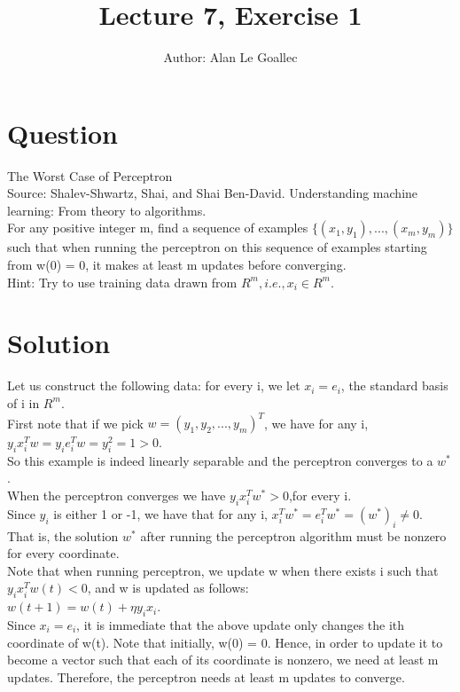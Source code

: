 \documentclass[11pt]{article}
\begin{document}
\title{Lecture 7, Exercise 1}
\maketitle
\author{Author: Alan Le Goallec}

\section{Question} The Worst Case of Perceptron\\
Source: Shalev-Shwartz, Shai, and Shai Ben-David. Understanding machine learning: From theory to algorithms.\\
For any positive integer m, find a sequence of examples $\{(x_1, y_1), ..., (x_m, y_m)\}$ such that when running the perceptron on this sequence of examples starting from w(0) = 0, it makes at least m updates before converging.\\

Hint: Try to use training data drawn from $R^m, i.e., x_i \in R^m$.


\section{Solution}
Let us construct the following data: for every i, we let $x_i = e_i$, the standard basis of i in $R^m$.\\
First note that if we pick $w = (y_1,y_2,...,y_m)^T$, we have for any i, $y_ix_i^Tw = y_ie_i^Tw =y_i^2 =1 >0$.\\
So this example is indeed linearly separable and the perceptron converges to a $w^*$.\\
When the perceptron converges we have $y_i x_i^Tw^* >0$,for every i. \\
Since $y_i$ is either 1 or -1, we have that for any i, $x_i^Tw^* =e_i^T w^* =(w^*)_i \neq 0$.\\
That is, the solution $w^*$ after running the perceptron algorithm must be nonzero for every coordinate.\\
Note that when running perceptron, we update w when there exists i such that $y_ix_i^T w(t) < 0$, and w is updated as follows:\\
$w(t+1) = w(t) + \eta y_ix_i$.\\
Since $x_i = e_i$, it is immediate that the above update only changes the ith coordinate of w(t). Note that initially, w(0) = 0. Hence, in order to update it to become a vector such that each of its coordinate is nonzero, we need at least m updates. Therefore, the perceptron needs at least m updates to converge.
\end{document}
